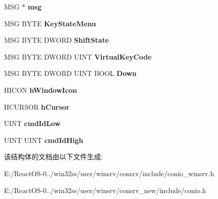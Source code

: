 \begin{DoxyCompactItemize}
M\+SG $\ast$ {\bfseries msg}
\item 
\mbox{\label{struct___f_r_o_n_t_e_n_d___v_t_b_l_ac43b2b557f22c7411e939bfdd1c31c9a}} 
M\+SG B\+Y\+TE {\bfseries Key\+State\+Menu}
\item 
\mbox{\label{struct___f_r_o_n_t_e_n_d___v_t_b_l_ac74e80594931bbfa0167014ef2fe92a1}} 
M\+SG B\+Y\+TE D\+W\+O\+RD {\bfseries Shift\+State}
\item 
\mbox{\label{struct___f_r_o_n_t_e_n_d___v_t_b_l_a66d5ab61dfa4d2d0f5bdd5c93e2de55a}} 
M\+SG B\+Y\+TE D\+W\+O\+RD U\+I\+NT {\bfseries Virtual\+Key\+Code}
\item 
\mbox{\label{struct___f_r_o_n_t_e_n_d___v_t_b_l_ad506634cedeae7f888e5671adf39452f}} 
M\+SG B\+Y\+TE D\+W\+O\+RD U\+I\+NT B\+O\+OL {\bfseries Down}
\item 
\mbox{\label{struct___f_r_o_n_t_e_n_d___v_t_b_l_a6a10b2aa476120f0ad6ca19b1ac991bb}} 
H\+I\+C\+ON {\bfseries h\+Window\+Icon}
\item 
\mbox{\label{struct___f_r_o_n_t_e_n_d___v_t_b_l_a84ac8ff71647ecbd879e85779febe535}} 
H\+C\+U\+R\+S\+OR {\bfseries h\+Cursor}
\item 
\mbox{\label{struct___f_r_o_n_t_e_n_d___v_t_b_l_ab9e9a039fba6fa76974235ca7122b6ae}} 
U\+I\+NT {\bfseries cmd\+Id\+Low}
\item 
\mbox{\label{struct___f_r_o_n_t_e_n_d___v_t_b_l_a37813de1dae3878053e20b09062435fa}} 
U\+I\+NT U\+I\+NT {\bfseries cmd\+Id\+High}
\end{DoxyCompactItemize}


该结构体的文档由以下文件生成\+:\begin{DoxyCompactItemize}
\item 
E\+:/\+React\+O\+S-\/0../win32ss/user/winsrv/consrv/include/conio\+\_\+winsrv.\+h\item 
E\+:/\+React\+O\+S-\/0../win32ss/user/winsrv/consrv\+\_\+new/include/conio.\+h\end{DoxyCompactItemize}

